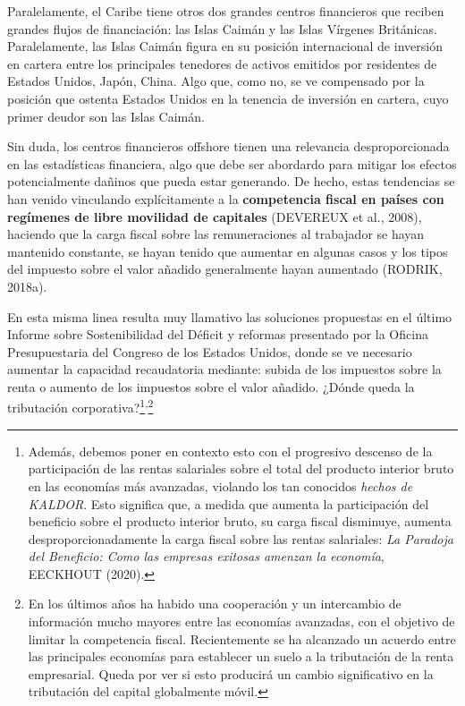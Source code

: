 \documentclass[10pt,a4paper]{article}
\begin{document}
Paralelamente, el Caribe tiene otros dos grandes centros financieros que reciben grandes flujos de financiación: las Islas Caimán y las Islas Vírgenes Británicas. Paralelamente, las Islas Caimán figura en su posición internacional de inversión en cartera entre los principales tenedores de activos emitidos por residentes de Estados Unidos, Japón, China. Algo que, como no, se ve compensado por la posición que ostenta Estados Unidos en la tenencia de inversión en cartera, cuyo primer deudor son las Islas Caimán.

Sin duda, los centros financieros offshore tienen una relevancia desproporcionada en las estadísticas financiera, algo que debe ser abordardo para mitigar los efectos potencialmente dañinos que pueda estar generando. De hecho, estas tendencias se han venido vinculando explícitamente a la \textbf{competencia fiscal en países con regímenes de libre movilidad de capitales} (DEVEREUX et al., 2008), haciendo que la carga fiscal sobre las remuneraciones al trabajador se hayan mantenido constante, se hayan tenido que aumentar en algunas casos y los tipos del impuesto sobre el valor añadido generalmente hayan aumentado (RODRIK, 2018a). 

En esta misma linea resulta muy llamativo las soluciones propuestas en el último Informe sobre Sostenibilidad del Déficit y reformas presentado por la Oficina Presupuestaria del Congreso de los Estados Unidos, donde se ve necesario aumentar la capacidad recaudatoria mediante: subida de los impuestos sobre la renta o aumento de los impuestos sobre el valor añadido. ¿Dónde queda la tributación corporativa?\footnote{%
    Además, debemos poner en contexto esto con el progresivo descenso de la participación de las rentas salariales sobre el total del producto interior bruto en las economías más avanzadas, violando los tan conocidos \textit{hechos de KALDOR}. Esto significa que, a medida que aumenta la participación del beneficio sobre el producto interior bruto, su carga fiscal disminuye, aumenta desproporcionadamente la carga fiscal sobre las rentas salariales: \textit{La Paradoja del Beneficio: Como las empresas exitosas amenzan la economía}, EECKHOUT (2020).
}\textsuperscript{,}\footnote{%
    En los últimos años ha habido una cooperación y un intercambio de información mucho mayores entre las economías avanzadas, con el objetivo de limitar la competencia fiscal. Recientemente se ha alcanzado un acuerdo entre las principales economías para establecer un suelo a la tributación de la renta empresarial. Queda por ver si esto producirá un cambio significativo en la tributación del capital globalmente móvil.
}
\end{document}
